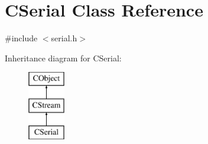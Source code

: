 \hypertarget{class_c_serial}{\section{C\-Serial Class Reference}
\label{class_c_serial}
}


{\ttfamily \#include $<$serial.\-h$>$}

Inheritance diagram for C\-Serial\-:\begin{figure}[H]
\begin{center}
\leavevmode
\includegraphics[height=3.000000cm]{d8/d1d/class_c_serial}
\end{center}
\end{figure}
